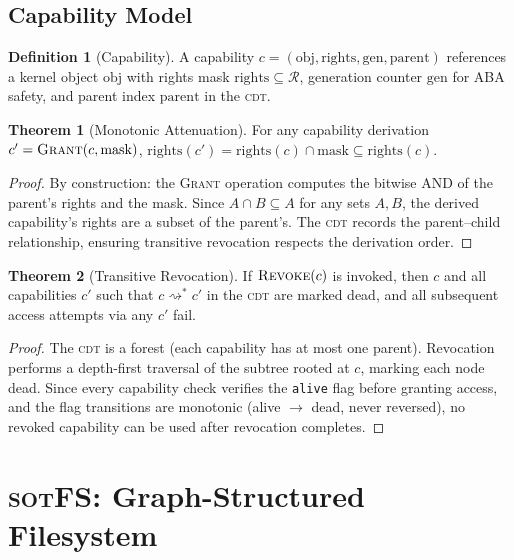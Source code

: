 \documentclass[11pt,a4paper]{article}
\theoremstyle{definition}
\newtheorem{definition}{Definition}[section]
\newtheorem{theorem}{Theorem}[section]
\theoremstyle{remark}
\newcommand{\sotfs}{\textsc{sotFS}}
\newcommand{\CDT}{\textsc{cdt}}
\begin{document}
\subsection{Capability Model}
\label{sec:arch-caps}

\begin{definition}[Capability]
\label{def:cap}
A capability $c = (\mathrm{obj}, \mathrm{rights}, \mathrm{gen},
\mathrm{parent})$ references a kernel object $\mathrm{obj}$ with
rights mask $\mathrm{rights} \subseteq \mathcal{R}$, generation
counter $\mathrm{gen}$ for ABA safety, and parent index
$\mathrm{parent}$ in the \CDT{}.
\end{definition}

\begin{theorem}[Monotonic Attenuation]
\label{thm:monotonic}
For any capability derivation $c' = \textsc{Grant}(c, \mathrm{mask})$,
$\mathrm{rights}(c') = \mathrm{rights}(c) \cap \mathrm{mask}
\subseteq \mathrm{rights}(c)$.
\end{theorem}

\begin{proof}
By construction: the \textsc{Grant} operation computes the bitwise
AND of the parent's rights and the mask. Since $A \cap B \subseteq A$
for any sets $A, B$, the derived capability's rights are a subset of
the parent's. The \CDT{} records the parent--child relationship,
ensuring transitive revocation respects the derivation order.
\end{proof}

\begin{theorem}[Transitive Revocation]
\label{thm:revocation}
If $\textsc{Revoke}(c)$ is invoked, then $c$ and all capabilities
$c'$ such that $c \rightsquigarrow^* c'$ in the \CDT{} are marked
dead, and all subsequent access attempts via any $c'$ fail.
\end{theorem}

\begin{proof}
The \CDT{} is a forest (each capability has at most one parent).
Revocation performs a depth-first traversal of the subtree rooted at
$c$, marking each node dead. Since every capability check verifies
the \texttt{alive} flag before granting access, and the flag
transitions are monotonic (alive $\to$ dead, never reversed), no
revoked capability can be used after revocation completes.
\end{proof}

\section{\sotfs{}: Graph-Structured Filesystem}
\label{sec:sotfs}
\end{document}
